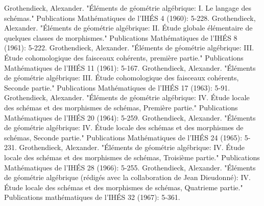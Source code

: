 \documentclass[11pt]{report}
\begin{document}
\begin{thebibliography}{1}
 Grothendieck, Alexander. "\'El\'ements de g\'eom\'etrie alg\'ebrique: I. Le langage des sch\'emas." Publications Math\'ematiques de l'IH\'ES 4 (1960): 5-228.
 Grothendieck, Alexander. "\'El\'ements de g\'eom\'etrie alg\'ebrique: II. \'Etude globale \'el\'ementaire de quelques classes de morphismes." Publications Math\'ematiques de l'IH\'ES 8 (1961): 5-222.
 Grothendieck, Alexander. "\'El\'ements de g\'eom\'etrie alg\'ebrique: III. \'Etude cohomologique des faisceaux coh\'erents, premi\`ere partie." Publications Math\'ematiques de l'IH\'ES 11 (1961): 5-167.
 Grothendieck, Alexander. "\'El\'ements de g\'eom\'etrie alg\'ebrique: III. \'Etude cohomologique des faisceaux coh\'erents, Seconde partie." Publications Math\'ematiques de l'IH\'ES 17 (1963): 5-91.
 Grothendieck, Alexander. "\'El\'ements de g\'eom\'etrie alg\'ebrique: IV. \'Etude locale des sch\'emas et des morphismes de sch\'emas, Premi\`ere partie." Publications Math\'ematiques de l'IH\'ES 20 (1964): 5-259.
 Grothendieck, Alexander. "\'El\'ements de g\'eom\'etrie alg\'ebrique: IV. \'Etude locale des sch\'emas et des morphismes de sch\'emas, Seconde partie." Publications Math\'ematiques de l'IH\'ES 24 (1965): 5-231.
 Grothendieck, Alexander. "\'El\'ements de g\'eom\'etrie alg\'ebrique: IV. \'Etude locale des sch\'emas et des morphismes de sch\'emas, Troisi\`eme partie." Publications Math\'ematiques de l'IH\'ES 28 (1966): 5-255.
 Grothendieck, Alexander. "\'El\'ements de g\'eom\'etrie alg\'ebrique (r\'edig\'es avec la collaboration de Jean Dieudonn\'e): IV. \'Etude locale des sch\'emas et des morphismes de sch\'emas, Quatrieme partie." Publications math\'ematiques de l'IH\'ES 32 (1967): 5-361.

\end{thebibliography}	















	
\end{document}
